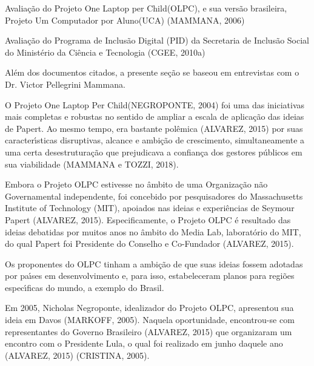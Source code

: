 \documentclass[
12pt,		%
openright,	%
twoside,  %
a4paper,			%
chapter=TITLE,		%
english,			%
french,				%
spanish,			%
brazil				%
]{USPSC-classe/USPSC}
\begin{document}
\begin{alineas}
\item Avalia\c{c}\~ao do Projeto \textquotedbl One Laptop per Child\textquotedbl  (OLPC), e sua vers\~ao brasileira, \textquotedbl Projeto Um Computador por Aluno\textquotedbl  (UCA)  (MAMMANA, 2006)
\item Avalia\c{c}\~ao do Programa de Inclus\~ao Digital (PID) da Secretaria de Inclus\~ao Social do Minist\'erio da Ci\^encia e Tecnologia  (CGEE, 2010a)
\end{alineas}

Al\'em dos documentos citados, a presente se\c{c}\~ao se baseou em entrevistas com o Dr. Victor Pellegrini Mammana.








O Projeto \textquotedbl One Laptop Per Child\textquotedbl  (NEGROPONTE, 2004) foi uma das iniciativas mais completas e robustas no sentido de ampliar a escala de aplica\c{c}\~ao das ideias de Papert. Ao mesmo tempo, era bastante pol\^emica (ALVAREZ, 2015) por suas caracter\'{\i}sticas disruptivas, alcance e ambi\c{c}\~ao de crescimento, simultaneamente a uma certa desestrutura\c{c}\~ao que prejudicava a confian\c{c}a dos gestores p\'ublicos em sua viabilidade (MAMMANA e TOZZI, 2018).








Embora o Projeto OLPC estivesse no \^ambito de uma Organiza\c{c}\~ao n\~ao Governamental independente,  foi concebido por pesquisadores do Massachusetts Institute of Technology (MIT), apoiados nas ideias e experi\^encias de Seymour Papert  (ALVAREZ, 2015). Especificamente, o Projeto OLPC \'e resultado das ideias debatidas por muitos anos no \^ambito do Media Lab, laborat\'orio do MIT, do qual Papert foi Presidente do Conselho e Co-Fundador  (ALVAREZ, 2015).








Os proponentes do OLPC tinham a ambi\c{c}\~ao de que suas ideias fossem adotadas por pa\'{\i}ses em desenvolvimento e, para isso, estabeleceram planos para regi\~oes espec\'{\i}ficas do mundo, a exemplo do Brasil.








Em 2005, Nicholas Negroponte, idealizador do Projeto OLPC, apresentou sua ideia em Davos (MARKOFF, 2005). Naquela oportunidade, encontrou-se com representantes do Governo Brasileiro (ALVAREZ, 2015) que organizaram um encontro com o Presidente Lula, o qual foi realizado em junho daquele ano (ALVAREZ, 2015) (CRISTINA, 2005).
\end{document}
